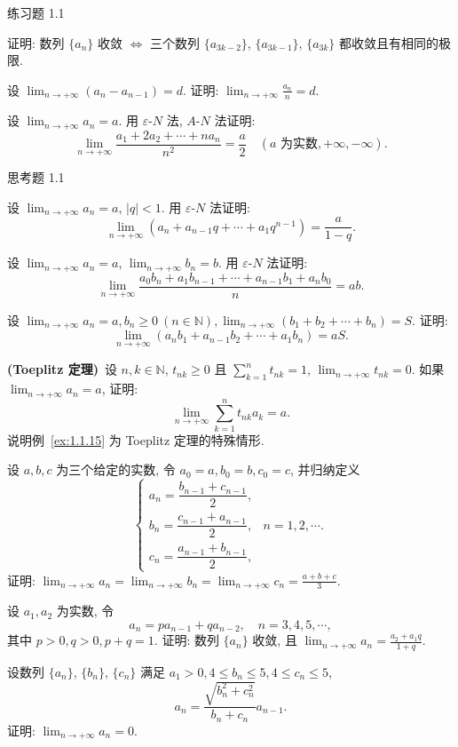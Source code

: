 \begin{exblock}{练习题 1.1}
\item 证明: 数列 $\{a_{n}\}$ 收敛 $\iff$ 三个数列 $\{a_{3k-2}\}$, $\{a_{3k-1}\}$, $\{a_{3k}\}$ 都收敛且有相同的极限.

\item 设 $\lim_{n\to+\infty}(a_{n}-a_{n-1})=d$. 证明: $\lim_{n\to+\infty}\frac{a_n}{n}=d$.

\item 设 $\lim_{n\to+\infty} a_n = a$. 用 $\varepsilon\text{-}N$ 法, $A\text{-}N$ 法证明:
\[
  \lim_{n\to+\infty}\frac{a_1+2a_2+\cdots+na_n}{n^2}=\frac{a}{2}\quad (a \text{ 为实数}, +\infty, -\infty).
\]
\end{exblock}

\begin{exblock}{思考题 1.1}
\item 设 $\lim_{n\to+\infty}a_n=a$, $|q| < 1$. 用 $\varepsilon\text{-}N$ 法证明:
\[
  \lim_{n\to+\infty}(a_{n}+a_{n-1}q+\cdots+a_{1}q^{n-1})=\frac{a}{1-q}.
\]

\item 设 $\lim_{n\to+\infty}a_n=a$, $\lim_{n\to+\infty}b_n=b$. 用 $\varepsilon\text{-}N$ 法证明:
\[
  \lim_{n\to+\infty}\frac{a_0b_n+a_1b_{n-1}+\cdots+a_{n-1}b_1+a_nb_0}{n}=ab.
\]

\item 设 $\lim_{n\to+\infty}a_n=a, b_n\geqslant 0\ (n\in\mathbb{N}), \lim_{n\to+\infty}(b_1+b_2+\cdots+b_n)=S$. 证明:
\[
  \lim_{n\to+\infty}(a_nb_1+a_{n-1}b_2+\cdots+a_1b_n)=aS.
\]

\item \textbf{(Toeplitz 定理)}\ 设 $n, k \in \mathbb{N}$, $t_{nk} \geqslant 0$ 且 $\sum_{k=1}^{n} t_{nk} = 1$, $\lim_{n \to +\infty} t_{nk} = 0$. 如果 $\lim_{n \to +\infty} a_n = a$, 证明:
\[
  \lim_{n \to +\infty} \sum_{k=1}^{n} t_{nk} a_k = a.
\]
说明例~\ref{ex:1.1.15} 为 Toeplitz 定理的特殊情形.

\item 设 $a, b, c$ 为三个给定的实数, 令 $a_{0} = a, b_{0} = b, c_{0} = c$, 并归纳定义
\[
  \begin{cases}
    a_{n}=\dfrac{b_{n-1}+c_{n-1}}{2},\\[6pt]
    b_{n}=\dfrac{c_{n-1}+a_{n-1}}{2}, & n = 1, 2, \cdots.\\[6pt]
    c_{n}=\dfrac{a_{n-1}+b_{n-1}}{2},
\end{cases}
\]
证明: $\lim_{n\to+\infty}a_n=\lim_{n\to+\infty}b_n=\lim_{n\to+\infty}c_n=\frac{a+b+c}{3}$.

\item 设 $a_{1}, a_{2}$ 为实数, 令
\[
  a_{n}=pa_{n-1}+qa_{n-2},\quad n=3, 4, 5, \cdots,
\]
其中 $p > 0, q > 0, p + q = 1$. 证明: 数列 $\{a_{n}\}$ 收敛, 且 $\lim_{n \to +\infty} a_{n} = \frac{a_{2} + a_{1} q}{1 + q}$.

\item 设数列 $\{a_{n}\}$, $\{b_{n}\}$, $\{c_{n}\}$ 满足 $a_{1} > 0, 4 \leqslant b_{n} \leqslant 5, 4 \leqslant c_{n} \leqslant 5$,
\[
  a_{n}=\frac{\sqrt{b_{n}^{2}+c_{n}^{2}}}{b_{n}+c_{n}}a_{n-1}.
\]
证明: $\lim_{n\to+\infty}a_n = 0$.
\end{exblock}
